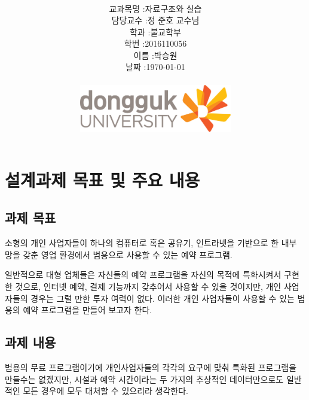 \documentclass[12pt,a4paper]{report}
\title{
	\centering
	\pgfornament[width=12cm,color=teal]{84}\\
	\vspace{1cm}
	\fontsize{50}{50} \selectfont {예약 시스템 구축\\설계과제 수행 계획서}\\
		\pgfornament[width=12cm,color=teal]{88}\\
	\vfill}
\author{
	\LARGE
	\begin{tabular}{rl}
		\hline
		교과목명 : & 자료구조와 실습\\
		담당교수 : & 정 준호 교수님\\
		학과 : & 불교학부 \\
		학번 : & 2016110056\\ 
		이름 : & 박승원\\
		날짜 : & \today\\
		\hline
	\end{tabular}\vspace{2cm}
	\\
\includegraphics[width=0.5\textwidth]{logo.jpg}
	}
\date{}
\begin{document}
\maketitle


\newpage
\tableofcontents

\noindent
\chapter{설계과제 목표 및 주요 내용}
\section{과제 목표}
소형의 개인 사업자들이 하나의 컴퓨터로 혹은 공유기, 인트라넷을 기반으로 한 내부 망을 갖춘 영업 환경에서 범용으로 사용할 수 있는 예약 프로그램.

일반적으로 대형 업체들은 자신들의 예약 프로그램을 자신의 목적에 특화시켜서 구현한 것으로, 인터넷 예약, 결제 기능까지 갖추어서 사용할 수 있을 것이지만, 개인 사업자들의 경우는 그럴 만한 투자 여력이 없다. 이러한 개인 사업자들이 사용할 수 있는 범용의 예약 프로그램을 만들어 보고자 한다.
\section{과제 내용}
범용의 무료 프로그램이기에 개인사업자들의 각각의 요구에 맞춰 특화된 프로그램을 만들수는 없겠지만, 시설과 예약 시간이라는 두 가지의 추상적인 데이터만으로도 일반적인 모든 경우에 모두 대처할 수 있으리라 생각한다. 
\end{document}
